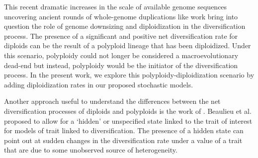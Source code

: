 This recent dramatic increases in the scale of available genome sequences uncovering ancient rounds of whole-genome duplications like\citet{landis_2018} work bring into question  the role of genome downsizing and diploidization in the diversification process\citep{soltis_2015diploidization, dodsworth_2015}. 
The presence of  a significant  and positive net diversification rate for diploids can be  the result of a polyploid lineage that has been diploidized. Under this scenario, polyploidy could not longer be considered a macroevolutionary dead-end but instead, polyploidy would be the initiator of the diversification process. In the present work, we explore this polyploidy-diploidization scenario by adding diploidization rates in our proposed stochastic models.



Another approach useful to understand the differences between the net diversification processes of diploids and polyploids is the work of  \citet{beaulieu_2016}. Beaulieu et al.  proposed to  allow for a `hidden' or unspecified state linked to the trait of interest for models of trait linked to diversification. The presence of a hidden state can point out at sudden changes in the diversification rate under a value of a trait that are due to some unobserved source of heterogeneity.  %


